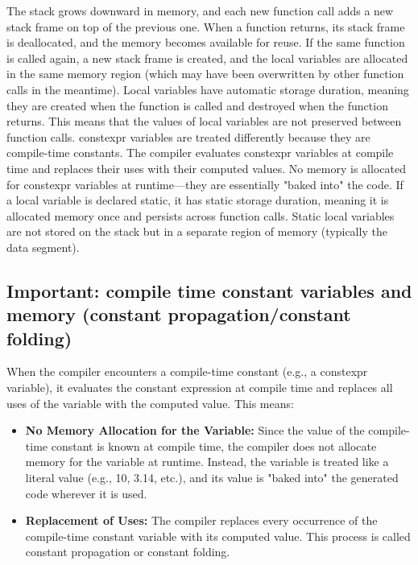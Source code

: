 \documentclass{report}
\begin{document}
    The stack grows downward in memory, and each new function call adds a new stack frame on top of the previous one.
    \bigbreak \noindent 
    When a function returns, its stack frame is deallocated, and the memory becomes available for reuse.
    \bigbreak \noindent 
    If the same function is called again, a new stack frame is created, and the local variables are allocated in the same memory region (which may have been overwritten by other function calls in the meantime).
    \bigbreak \noindent 
    Local variables have automatic storage duration, meaning they are created when the function is called and destroyed when the function returns.
    \bigbreak \noindent 
    This means that the values of local variables are not preserved between function calls.
    \bigbreak \noindent 
    constexpr variables are treated differently because they are compile-time constants.
    \bigbreak \noindent 
    The compiler evaluates constexpr variables at compile time and replaces their uses with their computed values.
    \bigbreak \noindent 
    No memory is allocated for constexpr variables at runtime—they are essentially "baked into" the code.
    \bigbreak \noindent 
    If a local variable is declared static, it has static storage duration, meaning it is allocated memory once and persists across function calls.
    \bigbreak \noindent 
    Static local variables are not stored on the stack but in a separate region of memory (typically the data segment).

    \bigbreak \noindent 
    \subsection{Important: compile time constant variables and memory (constant propagation/constant folding)}
    \bigbreak \noindent 
    When the compiler encounters a compile-time constant (e.g., a constexpr variable), it evaluates the constant expression at compile time and replaces all uses of the variable with the computed value. This means:
    \begin{itemize}
        \item \textbf{No Memory Allocation for the Variable:} Since the value of the compile-time constant is known at compile time, the compiler does not allocate memory for the variable at runtime.
            \bigbreak \noindent 
            Instead, the variable is treated like a literal value (e.g., 10, 3.14, etc.), and its value is "baked into" the generated code wherever it is used.
        \item \textbf{Replacement of Uses:} The compiler replaces every occurrence of the compile-time constant variable with its computed value.
        This process is called constant propagation or constant folding.
    \end{itemize}
\end{document}
